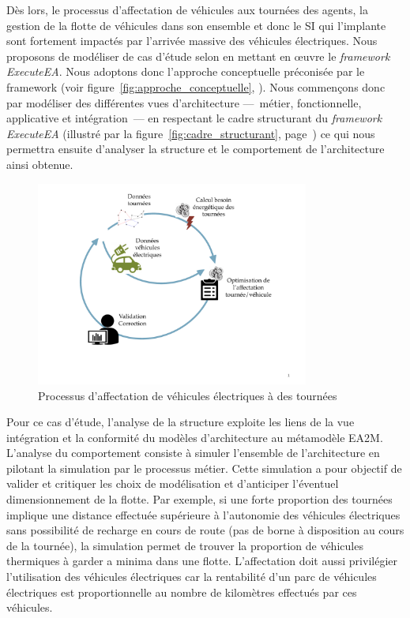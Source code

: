     Dès lors, le processus d'affectation de véhicules aux tournées des agents,
    la gestion de la flotte de véhicules dans son ensemble et donc le SI qui
    l'implante sont fortement impactés par l'arrivée massive des véhicules
    électriques. Nous proposons de modéliser de cas d'étude selon en mettant en
    œuvre le \emph{framework ExecuteEA}. Nous adoptons donc l'approche
    conceptuelle préconisée par le framework (voir
    figure~\ref{fig:approche_conceptuelle},
    \pageref{fig:approche_conceptuelle}). Nous commençons donc par modéliser des
    différentes vues d'architecture —~métier, fonctionnelle, applicative et
    intégration~— en respectant le cadre structurant du \emph{framework
    ExecuteEA} (illustré par la figure~\ref{fig:cadre_structurant},
    page~\pageref{fig:cadre_structurant}) ce qui nous permettra ensuite
    d'analyser la structure et le comportement de l'architecture ainsi obtenue.

    \begin{figure}[!htbp]
     \begin{center}
      \includegraphics[trim=0cm 3cm 0cm 0cm, width=0.8\textwidth]{figures/5_implementation/processus_metier.pdf}
     \end{center}
     \caption{Processus d'affectation de véhicules électriques à des tournées}
     \label{fig:processus_metier}
    \end{figure}

    Pour ce cas d'étude, l'analyse de la structure exploite les liens de la vue
    intégration et la conformité du modèles d'architecture au métamodèle EA2M.
    L'analyse du comportement consiste à simuler l'ensemble de l'architecture en
    pilotant la simulation par le processus métier. Cette simulation a pour
    objectif de valider et critiquer  les choix de modélisation et d'anticiper
    l'éventuel dimensionnement de la flotte. Par exemple, si une forte
    proportion des tournées implique une distance effectuée supérieure à
    l'autonomie des véhicules électriques sans possibilité de recharge en cours
    de route (pas de borne à disposition au cours de la tournée), la simulation
    permet  de trouver la proportion de véhicules thermiques à garder a minima
    dans une flotte. L'affectation doit aussi privilégier l'utilisation des
    véhicules électriques car la rentabilité d'un parc de véhicules électriques
    est proportionnelle au nombre de kilomètres effectués par ces véhicules.

